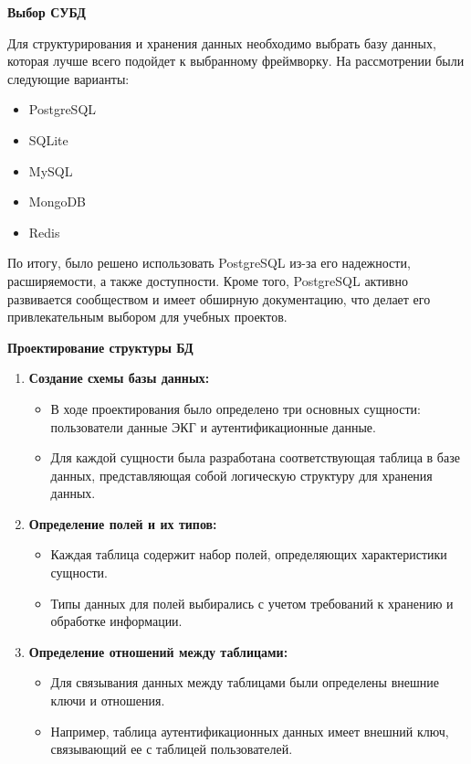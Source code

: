 \documentclass[12pt, russian]{extarticle}
\begin{document}
\begin{spacing}{1.5}
\par \noindent \textbf{Выбор СУБД}

Для структурирования и хранения данных необходимо выбрать базу данных, которая лучше всего
подойдет к выбранному фреймворку. На рассмотрении были следующие варианты:

\begin{itemize}
    \item PostgreSQL
    \item SQLite
    \item MySQL
    \item MongoDB
    \item Redis
\end{itemize}

По итогу, было решено использовать PostgreSQL из-за его надежности, расширяемости, а также доступности.
Кроме того, PostgreSQL активно развивается сообществом и имеет обширную документацию,
что делает его привлекательным выбором для учебных проектов.

\par \noindent \textbf{Проектирование структуры БД}

\begin{enumerate}
    \item \textbf{Создание схемы базы данных:}
        \begin{itemize}
            \item В ходе проектирования было определено три основных сущности: пользователи
                данные ЭКГ и аутентификационные данные.
            \item Для каждой сущности была разработана соответствующая таблица в базе данных,
                представляющая собой логическую структуру для хранения данных.
        \end{itemize}
    \item \textbf{Определение полей и их типов:}
        \begin{itemize}
            \item Каждая таблица содержит набор полей, определяющих характеристики сущности.
            \item Типы данных для полей выбирались с учетом требований к хранению и обработке информации.
        \end{itemize}
    \item \textbf{Определение отношений между таблицами:}
        \begin{itemize}
            \item Для связывания данных между таблицами были определены внешние ключи и отношения.
            \item Например, таблица аутентификационных данных имеет внешний ключ, связывающий ее с таблицей пользователей.
        \end{itemize}
\end{enumerate}


\end{spacing}
\end{document}
